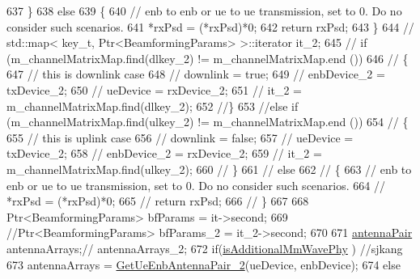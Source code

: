 \begin{DoxyCode}
637         \}
638         \textcolor{keywordflow}{else}
639         \{
640                 \textcolor{comment}{// enb to enb or ue to ue transmission, set to 0. Do no consider such scenarios.}
641                 *rxPsd = (*rxPsd)*0;
642                 \textcolor{keywordflow}{return} rxPsd;
643         \}
644 \textcolor{comment}{//      std::map< key\_t, Ptr<BeamformingParams> >::iterator it\_2;}
645 \textcolor{comment}{//      if (m\_channelMatrixMap.find(dlkey\_2) != m\_channelMatrixMap.end ())}
646 \textcolor{comment}{//              \{}
647                         \textcolor{comment}{// this is downlink case}
648         \textcolor{comment}{//              downlink = true;}
649         \textcolor{comment}{//              enbDevice\_2 = txDevice\_2;}
650         \textcolor{comment}{//              ueDevice = rxDevice\_2;}
651                 \textcolor{comment}{//      it\_2 = m\_channelMatrixMap.find(dlkey\_2);}
652                 \textcolor{comment}{//\}}
653                 \textcolor{comment}{//else if (m\_channelMatrixMap.find(ulkey\_2) != m\_channelMatrixMap.end ())}
654         \textcolor{comment}{//      \{}
655                         \textcolor{comment}{// this is uplink case}
656         \textcolor{comment}{//              downlink = false;}
657         \textcolor{comment}{//              ueDevice = txDevice\_2;}
658         \textcolor{comment}{//              enbDevice\_2 = rxDevice\_2;}
659         \textcolor{comment}{//              it\_2 = m\_channelMatrixMap.find(ulkey\_2);}
660         \textcolor{comment}{//      \}}
661         \textcolor{comment}{//      else}
662         \textcolor{comment}{//      \{}
663                         \textcolor{comment}{// enb to enb or ue to ue transmission, set to 0. Do no consider such scenarios.}
664                 \textcolor{comment}{//      *rxPsd = (*rxPsd)*0;}
665         \textcolor{comment}{//              return rxPsd;}
666         \textcolor{comment}{//      \}}
667 
668         Ptr<BeamformingParams> bfParams = it->second;
669         \textcolor{comment}{//Ptr<BeamformingParams> bfParams\_2 = it\_2->second;}
670 
671         \hyperlink{namespacens3_aa7da494dc75bd8e5232a27429c48a195}{antennaPair} antennaArrays;\textcolor{comment}{// antennaArrays\_2;}
672         \textcolor{keywordflow}{if}(\hyperlink{classns3_1_1MmWaveBeamforming_ab99a829ca6ca2545cad6551b648484bb}{isAdditionalMmWavePhy} ) \textcolor{comment}{//sjkang}
673          antennaArrays = \hyperlink{classns3_1_1MmWaveBeamforming_ab8ccc7d4fd27045fd702ee287e7098cd}{GetUeEnbAntennaPair\_2}(ueDevice, enbDevice);
674         \textcolor{keywordflow}{else}

\end{DoxyCode}
